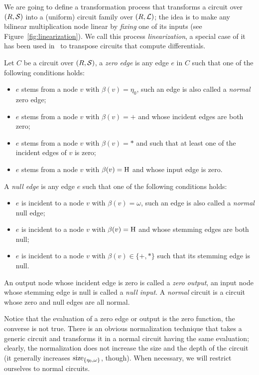 We are going to define a transformation process that transforms a
circuit over $(R,\mathcal{S})$ into a (uniform) circuit family over
$(R,\mathcal{L})$; the idea is to make any bilinear multiplication node
linear by \emph{fixing} one of its inputs (see
Figure~\ref{fig:linearization}). We call this process
\emph{linearization}, a special case of it has been used
in~\cite{gashkov+gashkov05,sergeev08} to transpose circuits that
compute differentials.

\begin{definition}
  Let $C$ be a circuit over $(R,\mathcal{S})$, a
  \emph{zero edge} is any edge $e$ in $C$ such that
  one of the following conditions holds:
  \begin{itemize}
  \item $e$ stems from a node $v$ with $\beta(v)=\eta_0$, such an edge
    is also called a \emph{normal} zero edge;
  \item $e$ stems from a node $v$ with $\beta(v)=+$ and whose incident
    edges are both zero;
  \item $e$ stems from a node $v$ with $\beta(v)=*$ and such that at
    least one of the incident edges of $v$ is zero;
  \item $e$ stems from a node $v$ with $\beta(v)=\operatorname{H}$ and whose input
    edge is zero.
  \end{itemize}
  A \emph{null edge} is any edge $e$ such that one of
  the following conditions holds:
  \begin{itemize}
  \item $e$ is incident to a node $v$ with $\beta(v)=\omega$, such an
    edge is also called a \emph{normal} null edge;
  \item $e$ is incident to a node $v$ with $\beta(v)=\operatorname{H}$ and whose
    stemming edges are both null;
  \item $e$ is incident to a node $v$ with $\beta(v)\in\{+,*\}$ such
    that its stemming edge is null.
  \end{itemize}
  An output node whose incident edge is zero is called a \emph{zero
    output}, an input node whose stemming edge is null is called a
  \emph{null input}.  A \emph{normal} circuit is a circuit whose zero
  and null edges are all normal.
\end{definition}

Notice that the evaluation of a zero edge or output is the zero
function, the converse is not true.  There is an obvious normalization
technique that takes a generic circuit and transforms it in a normal
circuit having the same evaluation; clearly, the normalization does
not increase the size and the depth of the circuit (it generally
increases $\operatorname{size}_{\{\eta_0,\omega\}}$, though). When necessary, we
will restrict ourselves to normal circuits.

